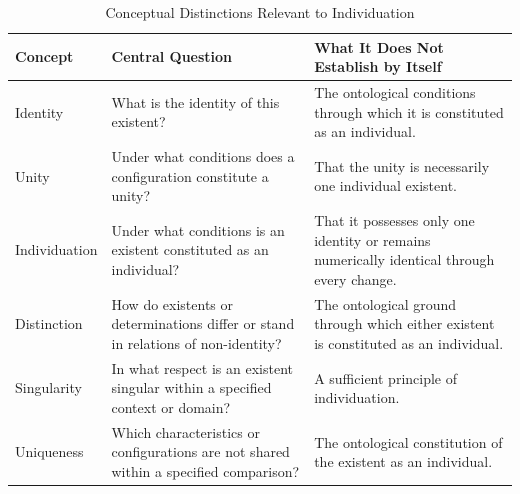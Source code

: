 %
%
%
%

\begin{table}[htbp]
\centering
\caption{Conceptual Distinctions Relevant to Individuation}
\label{tab:identity-individuation-distinctions}

\small
\renewcommand{\arraystretch}{1.25}

\begin{tabular}{|p{}|p{}|p{}|}
\hline
\textbf{Concept}
&
\textbf{Central Question}
&
\textbf{What It Does Not Establish by Itself}
\\
\hline

Identity
&
What is the identity of this existent?
&
The ontological conditions through which it is constituted as an individual.
\\
\hline

Unity
&
Under what conditions does a configuration constitute a unity?
&
That the unity is necessarily one individual existent.
\\
\hline

Individuation
&
Under what conditions is an existent constituted as an individual?
&
That it possesses only one identity or remains numerically identical through every change.
\\
\hline

Distinction
&
How do existents or determinations differ or stand in relations of non-identity?
&
The ontological ground through which either existent is constituted as an individual.
\\
\hline

Singularity
&
In what respect is an existent singular within a specified context or domain?
&
A sufficient principle of individuation.
\\
\hline

Uniqueness
&
Which characteristics or configurations are not shared within a specified comparison?
&
The ontological constitution of the existent as an individual.
\\
\hline


\end{tabular}
\end{table}
